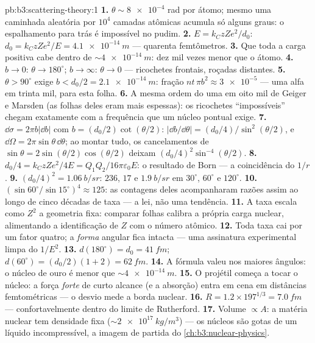 \begin{solution}{pb:b3:scattering-theory:1}
\textbf{1.} $\theta \sim \num{8e-4}$ rad por átomo; mesmo uma caminhada
aleatória por $10^4$ camadas atômicas acumula só alguns graus: o
espalhamento para trás é impossível no pudim.
\textbf{2.} $E = k_CzZe^2/d_0$: $d_0 = k_CzZe^2/E =
\qty{4.1e-14}{m}$ --- quarenta femtômetros.
\textbf{3.} Que toda a carga positiva cabe dentro de
$\sim\qty{4e-14}{m}$: dez mil vezes menor que o átomo.
\textbf{4.} $b \to 0$: $\theta \to 180^\circ$; $b \to \infty$:
$\theta \to 0$ --- ricochetes frontais, roçadas distantes.
\textbf{5.} $\theta > 90^\circ$ exige $b < d_0/2 =
\qty{2.1e-14}{m}$: fração $nt\,\pi b^2 \approx \num{3e-5}$ --- uma
alfa em trinta mil, para esta folha.
\textbf{6.} A mesma ordem do uma em oito mil de Geiger e Marsden (as
folhas deles eram mais espessas): os ricochetes ``impossíveis'' chegam
exatamente com a frequência que um núcleo pontual exige.
\textbf{7.} $\dd\sigma = 2\pi b|\dd b|$ com $b =
(d_0/2)\cot(\theta/2)$: $|\dd b/\dd\theta| = (d_0/4)/\sin^2(
\theta/2)$, e $\dd\Omega = 2\pi\sin\theta\,\dd\theta$; ao montar tudo,
os cancelamentos de $\sin\theta = 2\sin(\theta/2)\cos(\theta/2)$ deixam
$(d_0/4)^2\sin^{-4}(\theta/2)$.
\textbf{8.} $d_0/4 = k_CzZe^2/4E = Q_1Q_2/16\pi\varepsilon_0E$: o
resultado de Born --- a coincidência do $1/r$.
\textbf{9.} $(d_0/4)^2 = \qty{1.06}{b/sr}$: $236$, $17$ e
$\qty{1.9}{b/sr}$ em $30^\circ$, $60^\circ$ e $120^\circ$.
\textbf{10.} $(\sin60^\circ/\sin15^\circ)^4 \approx 125$: as contagens
deles acompanharam razões assim ao longo de cinco décadas de taxa --- a
lei, não uma tendência.
\textbf{11.} A taxa escala como $Z^2$ a geometria fixa: comparar folhas
calibra a própria carga nuclear, alimentando a identificação de $Z$ com
o número atômico.
\textbf{12.} Toda taxa cai por um fator quatro; a \emph{forma} angular
fica intacta --- uma assinatura experimental limpa do $1/E^2$.
\textbf{13.} $d(180^\circ) = d_0 = \qty{41}{fm}$; $d(60^\circ) =
(d_0/2)(1 + 2) = \qty{62}{fm}$.
\textbf{14.} A fórmula valeu nos maiores ângulos: o núcleo de ouro é
menor que $\sim\qty{4e-14}{m}$.
\textbf{15.} O projétil começa a tocar o núcleo: a força \emph{forte}
de curto alcance (e a absorção) entra em cena em distâncias
femtométricas --- o desvio mede a borda nuclear.
\textbf{16.} $R = 1.2 \times 197^{1/3} = \qty{7.0}{fm}$ ---
confortavelmente dentro do limite de Rutherford.
\textbf{17.} Volume $\propto A$: a matéria nuclear tem densidade fixa
($\sim\qty{2e17}{kg/m^3}$) --- os núcleos são gotas de um líquido
incompressível, a imagem de partida do
\cref{ch:b3:nuclear-physics}.

\end{solution}
